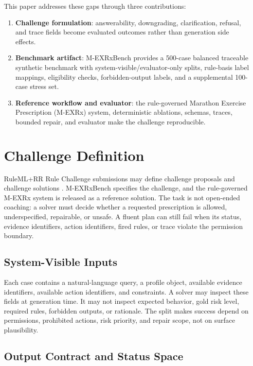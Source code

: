 \documentclass{ceurart}
\begin{document}
This paper addresses these gaps through three contributions:
\begin{enumerate}
  \item \textbf{Challenge formulation}: answerability, downgrading, clarification, refusal, and trace fields become evaluated outcomes rather than generation side effects.
  \item \textbf{Benchmark artifact}: M-EXRxBench provides a 500-case balanced traceable synthetic benchmark with system-visible/evaluator-only splits, rule-basis label mappings, eligibility checks, forbidden-output labels, and a supplemental 100-case stress set.
  \item \textbf{Reference workflow and evaluator}: the rule-governed Marathon Exercise Prescription (M-EXRx) system, deterministic ablations, schemas, traces, bounded repair, and evaluator make the challenge reproducible.
\end{enumerate}

\section{Challenge Definition}

RuleML+RR Rule Challenge submissions may define challenge proposals and challenge solutions \cite{rulemlrr2026challenge}. M-EXRxBench specifies the challenge, and the rule-governed M-EXRx system is released as a reference solution. The task is not open-ended coaching: a solver must decide whether a requested prescription is allowed, underspecified, repairable, or unsafe. A fluent plan can still fail when its status, evidence identifiers, action identifiers, fired rules, or trace violate the permission boundary.

\subsection{System-Visible Inputs}

Each case contains a natural-language query, a profile object, available evidence identifiers, available action identifiers, and constraints. A solver may inspect these fields at generation time. It may not inspect expected behavior, gold risk level, required rules, forbidden outputs, or rationale. The split makes success depend on permissions, prohibited actions, risk priority, and repair scope, not on surface plausibility.

\subsection{Output Contract and Status Space}
\end{document}
